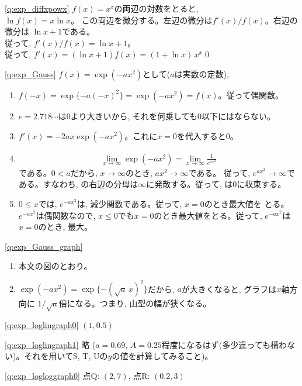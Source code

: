 \ref{q:exp_diffxpowx} $f(x)=x^x$の両辺の対数をとると,\\
$\ln f(x)=x\ln x$。
この両辺を微分する。左辺の微分は$f'(x)/f(x)$。右辺の微分は
$\ln x+1$である。\\従って, $f'(x)/f(x)=\ln x+1$。\\従って, 
$f'(x)=(\ln x+1)f(x)=(1+\ln x)\,x^x$\qed
\vspace{0.3cm}

\ref{q:exp_Gauss} $f(x)=\exp(-ax^2)$として($a$は実数の定数), 
\begin{enumerate}
\item $f(-x)=\exp\{-a(-x)^2\}=\exp(-ax^2)=f(x)$。従って偶関数。
\item $e=2.718\cdots$は0より大きいから, それを何乗しても0以下にはならない。
\item $f'(x)=-2ax\exp(-ax^2)$。これに$x=0$を代入すると0。
\item 
\begin{eqnarray}
\lim_{x\rightarrow\infty}\exp(-ax^2)=\lim_{x\rightarrow\infty}\frac{1}{e^{ax^2}}\label{eq:exp_Gauss_infty}
\end{eqnarray}
である。$0<a$だから, $x\rightarrow\infty$のとき, $ax^2\rightarrow\infty$である。
従って, $e^{ax^2}\rightarrow\infty$である。すなわち, 
の右辺の分母は$\infty$に発散する。従って, は0に収束する。
\item $0\leq x$では, $e^{-ax^2}$は, 減少関数である。従って, $x=0$のとき最大値を
とる。$e^{-ax^2}$は偶関数なので, $x\leq 0$でも$x=0$のとき最大値をとる。従って, 
$e^{-ax^2}$は$x=0$のとき, 最大。
\end{enumerate}
\mv

\ref{q:exp_Gauss_graph} 
\begin{enumerate}
\item 本文の図のとおり。
\item $\exp(-ax^2)=\exp\{-(\sqrt{a}\,x)^2\}$だから, $a$が大きくなると, グラフは$x$軸方向に
$1/\sqrt{a}$倍になる。つまり, 山型の幅が狭くなる。
\end{enumerate}
\mv

\ref{q:exp_loglingraph0}  $(1, 0.5)$
\mv

\ref{q:exp_loglingraph1} 略 
($a=0.69$, $A=0.25$程度になるはず(多少違っても構わない)。それを用いてS, T, Uの$y$の値を計算してみること)。
\mv

\ref{q:exp_logloggraph0} 点Q: $(2, 7)$, 点R: $(0.2, 3)$
\mv


